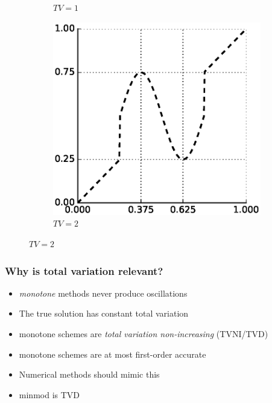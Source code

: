 \documentclass[11pt]{beamer}
\begin{document}
\begin{frame}
\begin{figure}[h]
\begin{subfigure}{0.3\textwidth}
      \caption{$TV = 1$}
    \end{subfigure}
    \begin{subfigure}{0.3\textwidth}
      \includegraphics[width=\textwidth]{figures/tv/higher}
      \caption{$TV = 2$}
    \end{subfigure}
  \end{figure}
\end{frame}

\begin{frame}
  \frametitle{Why is total variation relevant?}
  \begin{itemize}
  \item \emph{monotone} methods never produce oscillations
  \item The true solution has constant total variation
  \item monotone schemes are \emph{total variation non-increasing} (TVNI/TVD)
  \item monotone schemes are at most first-order accurate
  \item Numerical methods should mimic this
  \item minmod is TVD
  \end{itemize}
\end{frame}
\end{document}
